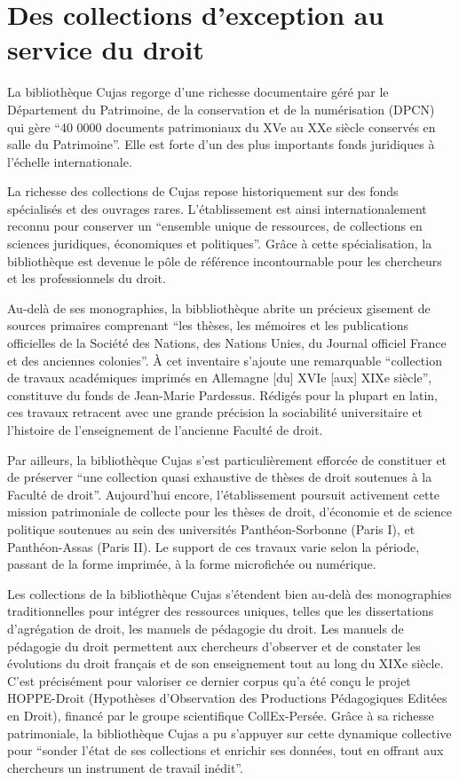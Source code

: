\section{Des collections d'exception au service du droit}

La bibliothèque Cujas regorge d'une richesse documentaire géré par le Département du Patrimoine, de la conservation et de la numérisation (DPCN) qui gère \enquote{40 0000 documents patrimoniaux du XVe au XXe siècle conservés en salle du Patrimoine}. Elle est forte d'un des plus importants fonds juridiques à l'échelle internationale.

La richesse des collections de Cujas repose historiquement sur des fonds spécialisés et des ouvrages rares. L'établissement est ainsi internationalement reconnu pour conserver un \enquote{ensemble unique de ressources, de collections en sciences juridiques, économiques et politiques}. Grâce à cette spécialisation, la bibliothèque est devenue le pôle de référence incontournable pour les chercheurs et les professionnels du droit.

Au-delà de ses monographies, la bibbliothèque abrite un précieux gisement de sources primaires comprenant \enquote{les thèses, les mémoires et les publications officielles de la Société des Nations, des Nations Unies, du Journal officiel France et des anciennes colonies}. À cet inventaire s'ajoute une remarquable \enquote{collection de travaux académiques imprimés en Allemagne [du] XVIe [aux] XIXe siècle}, constituve du fonds de Jean-Marie Pardessus. Rédigés pour la plupart en latin, ces travaux retracent avec une grande précision la sociabilité universitaire et l'histoire de l'enseignement de l'ancienne Faculté de droit. 

Par ailleurs, la bibliothèque Cujas s'est particulièrement efforcée de constituer et de préserver \enquote{une collection quasi exhaustive de thèses de droit soutenues à la Faculté de droit}. Aujourd'hui encore, l'établissement poursuit activement cette mission patrimoniale de collecte pour les thèses de droit, d'économie et de science politique soutenues au sein des universités Panthéon-Sorbonne (Paris I), et Panthéon-Assas (Paris II). Le support de ces travaux varie selon la période, passant de la forme imprimée, à la forme microfichée ou numérique.

Les collections de la bibliothèque Cujas s'étendent bien au-delà des monographies traditionnelles pour intégrer des ressources uniques, telles que les dissertations d'agrégation de droit, les manuels de pédagogie du droit. Les manuels de pédagogie du droit permettent aux chercheurs d'observer et de constater les évolutions du droit français et de son enseignement tout au long du XIXe siècle. C'est précisément pour valoriser ce dernier corpus qu'a été conçu le projet HOPPE-Droit (Hypothèses d'Observation des Productions Pédagogiques Editées en Droit), financé par le groupe scientifique CollEx-Persée. Grâce à sa richesse patrimoniale, la bibliothèque Cujas a pu s'appuyer sur cette dynamique collective pour \enquote{sonder l'état de ses collections et enrichir ses données, tout en offrant aux chercheurs un instrument de travail inédit}. 

